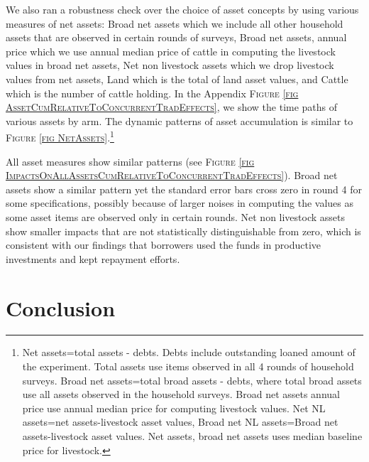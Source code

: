 	We also ran a robustness check over the choice of asset concepts by using various measures of net assets: \textsf{Broad net assets} which we include all other household assets that are observed in certain rounds of surveys, \textsf{Broad net assets, annual price} which we use annual median price of cattle in computing the livestock values in broad net assets, \textsf{Net non livestock assets} which we drop livestock values from net assets, \textsf{Land} which is the total of land asset values, and \textsf{Cattle} which is the number of cattle holding.  In the Appendix \textsc{\footnotesize Figure \ref{fig AssetCumRelativeToConcurrentTradEffects}}, we show the time paths of various assets by arm. The dynamic patterns of asset accumulation is similar to \textsc{\footnotesize Figure \ref{fig NetAssets}}.\footnote{\textsf{Net assets}=total assets - debts. Debts include outstanding loaned amount of the experiment. Total assets use items observed in all 4 rounds of household surveys. \textsf{Broad net assets}=total broad assets - debts, where total broad assets use all assets observed in the household surveys. \textsf{Broad net assets annual price} use annual median price for computing livestock values. \textsf{Net NL assets}=\textsf{net assets}-livestock asset values, \textsf{Broad net NL assets}=\textsf{Broad net assets}-livestock asset values. \textsf{Net assets, broad net assets} uses median baseline price for livestock.  } 

	All asset measures show similar patterns (see \textsc{\footnotesize Figure \ref{fig ImpactsOnAllAssetsCumRelativeToConcurrentTradEffects}}). \textsf{Broad net assets} show a similar pattern yet the standard error bars cross zero in round 4 for some specifications, possibly because of larger noises in computing the values as some asset items are observed only in certain rounds. \textsf{Net non livestock assets} show smaller impacts that are not statistically distinguishable from zero, which is consistent with our findings that borrowers used the funds in productive investments and kept repayment efforts. 




\section{Conclusion}
\label{SecConclusion}


